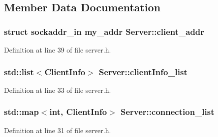 \subsection{Member Data Documentation}
\subsubsection[{\texorpdfstring{client\+\_\+addr}{client_addr}}]{\setlength{\rightskip}{0pt plus 5cm}struct sockaddr\+\_\+in my\+\_\+addr Server\+::client\+\_\+addr\hspace{0.3cm}{\ttfamily [private]}}\hypertarget{class_server_af0a54fbe85fc98a78e74df6f201f206d}{}\label{class_server_af0a54fbe85fc98a78e74df6f201f206d}


Definition at line 39 of file server.\+h.

\subsubsection[{\texorpdfstring{client\+Info\+\_\+list}{clientInfo_list}}]{\setlength{\rightskip}{0pt plus 5cm}std\+::list$<${\bf Client\+Info}$>$ Server\+::client\+Info\+\_\+list\hspace{0.3cm}{\ttfamily [private]}}\hypertarget{class_server_a26001cf00c762741706205d965844792}{}\label{class_server_a26001cf00c762741706205d965844792}


Definition at line 33 of file server.\+h.

\subsubsection[{\texorpdfstring{connection\+\_\+list}{connection_list}}]{\setlength{\rightskip}{0pt plus 5cm}std\+::map$<$int, {\bf Client\+Info}$>$ Server\+::connection\+\_\+list\hspace{0.3cm}{\ttfamily [private]}}\hypertarget{class_server_ab70b18639654e07a65802942db36dd39}{}\label{class_server_ab70b18639654e07a65802942db36dd39}


Definition at line 31 of file server.\+h.

